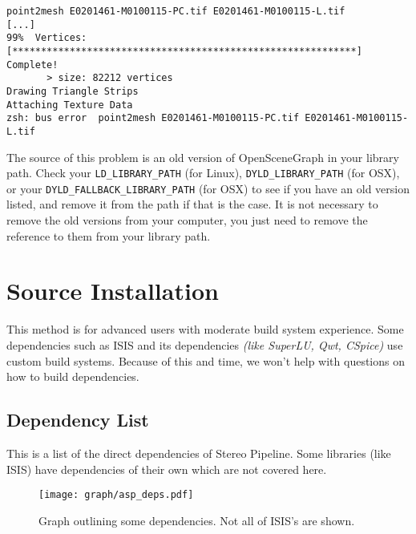 \begin{verbatim}
point2mesh E0201461-M0100115-PC.tif E0201461-M0100115-L.tif
[...]
99%  Vertices:   [************************************************************] Complete!
       > size: 82212 vertices
Drawing Triangle Strips
Attaching Texture Data
zsh: bus error  point2mesh E0201461-M0100115-PC.tif E0201461-M0100115-L.tif
\end{verbatim}

The source of this problem is an old version of OpenSceneGraph in
your library path. Check your \verb#LD_LIBRARY_PATH# (for Linux),
\verb#DYLD_LIBRARY_PATH# (for OSX), or your \verb#DYLD_FALLBACK_LIBRARY_PATH#
(for OSX) to see if you have an old version listed, and remove it
from the path if that is the case. It is not necessary to remove the
old versions from your computer, you just need to remove the reference
to them from your library path.

\pagebreak
\section{\label{sec:Source-Installation}Source Installation}

This method is for advanced users with moderate build system experience. Some dependencies such as ISIS and its dependencies \emph{(like SuperLU, Qwt, CSpice)} use custom build systems. Because of this and time, we won't help with questions on how to build dependencies.

\subsection{Dependency List}

This is a list of the direct dependencies of Stereo Pipeline. Some libraries
(like \ac{ISIS}) have dependencies of their own which are not covered here.

\begin{figure}[h]
  \centering
  \texttt{[image: graph/asp\_deps.pdf]}
  \caption{Graph outlining some dependencies. Not all of ISIS's are shown.}
\end{figure}

